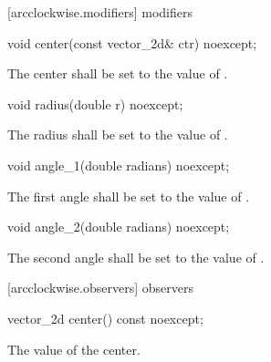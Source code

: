  [arcclockwise.modifiers]{ modifiers}

\begin{itemdecl}
    void center(const vector_2d& ctr) noexcept;
\end{itemdecl}
\begin{itemdescr}
	\pnum
	\effects
	The center shall be set to the value of .
\end{itemdescr}

\begin{itemdecl}
    void radius(double r) noexcept;
\end{itemdecl}
\begin{itemdescr}
	\pnum
	\effects
	The radius shall be set to the value of .
\end{itemdescr}

\begin{itemdecl}
    void angle_1(double radians) noexcept;
\end{itemdecl}
\begin{itemdescr}
	\pnum
	\effects
	The first angle shall be set to the value of .
\end{itemdescr}

\begin{itemdecl}
    void angle_2(double radians) noexcept;
\end{itemdecl}
\begin{itemdescr}
	\pnum
	\effects
	The second angle shall be set to the value of .
\end{itemdescr}

 [arcclockwise.observers]{ observers}

\begin{itemdecl}
    vector_2d center() const noexcept;
\end{itemdecl}
\begin{itemdescr}
	\pnum
	\returns
	The value of the center.
\end{itemdescr}

